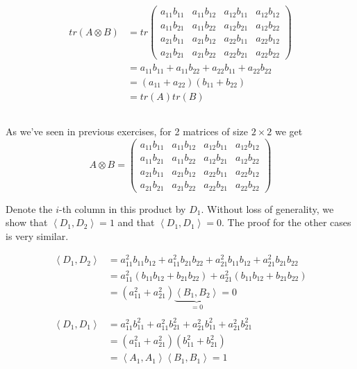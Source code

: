 \documentclass[a4paper,10pt]{hw}
\begin{document}
\begin{align*}
tr\left( A \otimes B \right) &= tr
\begin{pmatrix}
a_{11}b_{11} & a_{11}b_{12} & a_{12}b_{11} & a_{12}b_{12} \\
a_{11}b_{21} & a_{11}b_{22} & a_{12}b_{21} & a_{12}b_{22} \\
a_{21}b_{11} & a_{21}b_{12} & a_{22}b_{11} & a_{22}b_{12} \\
a_{21}b_{21} & a_{21}b_{22} & a_{22}b_{21} & a_{22}b_{22}
\end{pmatrix} \\
&= a_{11}b_{11} + a_{11}b_{22} + a_{22}b_{11} + a_{22}b_{22} \\
&= \left(a_{11} + a_{22}\right) \left(b_{11} + b_{22}\right) \\
&= tr\left(A\right) tr\left(B\right)
\end{align*}
\subsection{}

As we've seen in previous exercises, for 2 matrices of size $2\times2$ we get
$$
A \otimes B =
\begin{pmatrix}
a_{11}b_{11} & a_{11}b_{12} & a_{12}b_{11} & a_{12}b_{12} \\
a_{11}b_{21} & a_{11}b_{22} & a_{12}b_{21} & a_{12}b_{22} \\
a_{21}b_{11} & a_{21}b_{12} & a_{22}b_{11} & a_{22}b_{12} \\
a_{21}b_{21} & a_{21}b_{22} & a_{22}b_{21} & a_{22}b_{22}
\end{pmatrix}
$$

Denote the $i$-th column in this product by $D_1$. Without loss of generality, we show that $\left\langle D_1, D_2 \right\rangle = 1$ and that $\left\langle D_1, D_1 \right\rangle = 0$. The proof for the other cases is very similar.

\begin{align*}
\left\langle D_1, D_2 \right\rangle &= 
a_{11}^2 b_{11}b_{12} 
+ a_{11}^2 b_{21}b_{22}
+ a_{21}^2 b_{11}b_{12}
+ a_{21}^2 b_{21}b_{22} \\
&= 
a_{11}^2\left(b_{11}b_{12} + b_{21}b_{22}\right) 
+ a_{21}^2\left(b_{11}b_{12} + b_{21}b_{22}\right) \\
&= \left(a_{11}^2 + a_{21}^2\right) 
\underbrace{\left\langle B_1, B_2 \right\rangle}_{=0} = 0 
\\
\\
\left\langle D_1, D_1 \right\rangle &= 
a_{11}^2 b_{11}^2
+ a_{11}^2 b_{21}^2
+ a_{21}^2 b_{11}^2
+ a_{21}^2 b_{21}^2 \\
&=
\left(a_{11}^2 + a_{21}^2\right) \left(b_{11}^2 + b_{21}^2\right) \\
&=
\left\langle A_1, A_1 \right\rangle \left\langle B_1, B_1 \right\rangle = 1
\end{align*}
\end{document}
